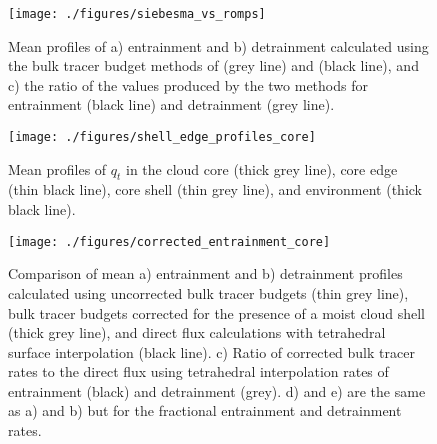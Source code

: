 \documentclass[draft,grl]{agutex}
\begin{document}



\begin{figure}
  \label{fig:siebesma_vs_romps}
  \noindent\texttt{[image: ./figures/siebesma\_vs\_romps]}
  \caption{Mean profiles of a) entrainment and b) detrainment calculated 
  using the bulk tracer budget methods of \cite{Siebesma1995} (grey line) 
  and \cite{Romps2010} (black line), and c) the ratio of the values produced 
  by the two methods for entrainment (black line) and detrainment (grey line).
  }
\end{figure}

\begin{figure}
  \label{fig:shell_edge_profiles}
  \noindent\texttt{[image: ./figures/shell\_edge\_profiles\_core]}
  \caption{Mean profiles of $q_t$ in the cloud core (thick grey line), core 
  edge (thin black line), core shell (thin grey line), and environment (thick 
  black line).
  }
\end{figure}

\begin{figure}
  \label{fig:corrected_entrainment}
  \noindent\texttt{[image: ./figures/corrected\_entrainment\_core]}
  \caption{Comparison of mean a) entrainment and b) detrainment profiles 
calculated using uncorrected bulk tracer budgets (thin grey line), bulk tracer 
budgets corrected for the presence of a moist cloud shell (thick grey line), and
direct flux calculations with tetrahedral surface interpolation (black line).
c) Ratio of corrected bulk tracer rates to the direct flux using
tetrahedral interpolation rates of entrainment (black) and detrainment (grey).
d) and e) are the same as a) and b) but for the fractional entrainment and
detrainment rates.}
\end{figure}

%
%
%
%
%
%

\end{document}
